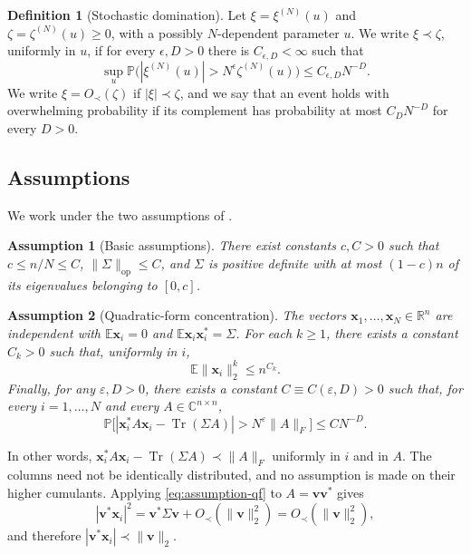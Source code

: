 \documentclass[11pt,reqno]{amsart}
\def\R{\mathbb{R}}
\def\bv{\mathbf{v}}
\def\x{\mathbf{x}}
\def\P{\mathbb{P}}
\def\C{\mathbb{C}}
\def\E{\mathbb{E}}
\def\op{\mathrm{op}}
\def\eps{\varepsilon}
\def\Tr{\operatorname{Tr}}
\newtheorem{assumption}{Assumption}
\theoremstyle{definition}
\newtheorem{defi}[theorem]{Definition}
\numberwithin{equation}{section}
\numberwithin{figure}{section}
\begin{document}
\begin{defi}[Stochastic domination]\label{def:prec}
Let $\xi=\xi^{(N)}(u)$ and $\zeta=\zeta^{(N)}(u)\ge0$, with a possibly $N$-dependent parameter $u$.  We write $\xi\prec\zeta$, uniformly in $u$, if for every $\epsilon,D>0$ there is $C_{\epsilon,D}<\infty$ such that
\[
 \sup_u\P \bigl(|\xi^{(N)}(u)|>N^\epsilon \zeta^{(N)}(u)\bigr)\le C_{\epsilon,D}N^{-D}.
\]
We write $\xi=O_\prec (\zeta)$ if $|\xi|\prec\zeta$, and we say that an event holds with overwhelming probability if its complement has probability at most $C_DN^{-D}$ for every $D>0$.
\end{defi}


\subsection{Assumptions}

We work under the two assumptions of \cite{fan2026anisotropic}.

\begin{assumption}[Basic assumptions]\label{ass:A1}
    There exist constants $c,C >0$ such that $c\le n/N\le C$, $\| \Sigma \|_\op \leq C$, and $\Sigma$ is positive definite with at most $(1-c)n$ of its eigenvalues belonging to $[0,c]$.
\end{assumption}

\begin{assumption}[Quadratic-form concentration]\label{ass:A2}
 The vectors $\x_1,\ldots,\x_N\in\R^n$ are independent with $\E\x_i = 0$ and $\E\x_i \x_i^* = \Sigma$. For each $k \geq 1$, there exists a constant $C_k>0$ such that, uniformly in $i$,
\[
 \E\|\x_i\|_2^k\le n^{C_k}.
\]
Finally, for any $\eps,D >0$, there exists a constant $C \equiv C(\eps,D)>0$ such that, for every $i = 1, \ldots, N$ and every $A\in\C^{n\times n}$,
\begin{equation}\label{eq:assumption-qf}
 \P \big[ |\x_i^*A\x_i-\Tr(\Sigma A)| > N^\eps \|A\|_F \big] \le C N^{-D}.
\end{equation}
\end{assumption}

In other words, $\x_i^*A\x_i-\Tr(\Sigma A) \prec \|A\|_F$ uniformly in $i$ and in $A$. The columns need not be identically distributed, and no assumption is made on their higher cumulants. Applying \eqref{eq:assumption-qf} to $A=\bv\bv^*$ gives
\[
 |\bv^*\x_i|^2=\bv^*\Sigma \bv+O_\prec(\|\bv\|_2^2)
 =O_\prec(\|\bv\|_2^2),
\]
and therefore $|\bv^*\x_i|\prec\|\bv\|_2$.
\end{document}
